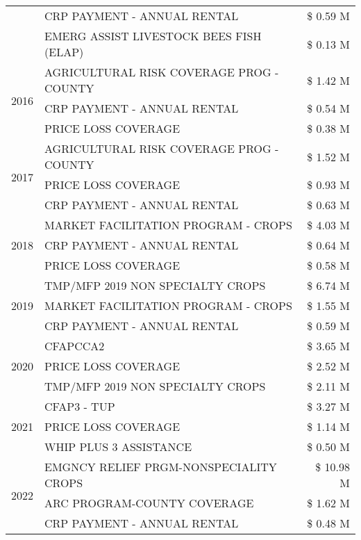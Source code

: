 \begin{tabular}{llr}
 & CRP PAYMENT - ANNUAL RENTAL & \$ 0.59 M \\
 & EMERG ASSIST LIVESTOCK BEES FISH (ELAP) & \$ 0.13 M \\
\cline{1-3}
\multirow[t]{3}{*}{2016} & AGRICULTURAL RISK COVERAGE PROG - COUNTY & \$ 1.42 M \\
 & CRP PAYMENT - ANNUAL RENTAL & \$ 0.54 M \\
 & PRICE LOSS COVERAGE & \$ 0.38 M \\
\cline{1-3}
\multirow[t]{3}{*}{2017} & AGRICULTURAL RISK COVERAGE PROG - COUNTY & \$ 1.52 M \\
 & PRICE LOSS COVERAGE & \$ 0.93 M \\
 & CRP PAYMENT - ANNUAL RENTAL & \$ 0.63 M \\
\cline{1-3}
\multirow[t]{3}{*}{2018} & MARKET FACILITATION PROGRAM - CROPS & \$ 4.03 M \\
 & CRP PAYMENT - ANNUAL RENTAL & \$ 0.64 M \\
 & PRICE LOSS COVERAGE & \$ 0.58 M \\
\cline{1-3}
\multirow[t]{3}{*}{2019} & TMP/MFP 2019 NON SPECIALTY CROPS & \$ 6.74 M \\
 & MARKET FACILITATION PROGRAM - CROPS & \$ 1.55 M \\
 & CRP PAYMENT - ANNUAL RENTAL & \$ 0.59 M \\
\cline{1-3}
\multirow[t]{3}{*}{2020} & CFAPCCA2 & \$ 3.65 M \\
 & PRICE LOSS COVERAGE & \$ 2.52 M \\
 & TMP/MFP 2019 NON SPECIALTY CROPS & \$ 2.11 M \\
\cline{1-3}
\multirow[t]{3}{*}{2021} & CFAP3 - TUP & \$ 3.27 M \\
 & PRICE LOSS COVERAGE & \$ 1.14 M \\
 & WHIP PLUS 3 ASSISTANCE & \$ 0.50 M \\
\cline{1-3}
\multirow[t]{3}{*}{2022} & EMGNCY RELIEF PRGM-NONSPECIALITY CROPS & \$ 10.98 M \\
 & ARC PROGRAM-COUNTY COVERAGE & \$ 1.62 M \\
 & CRP PAYMENT - ANNUAL RENTAL & \$ 0.48 M \\
\cline{1-3}
\bottomrule
\end{tabular}
